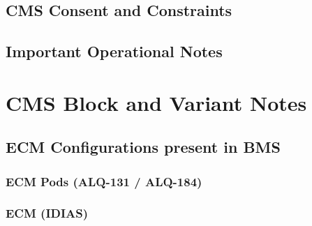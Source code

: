 \documentclass[11pt, a4paper, twoside]{report}
\begin{document}
\subsection{CMS Consent and Constraints}
\label{sec:C5-S2-S3}

\subsection{Important Operational Notes}
\label{sec:C5-S2-S4}

\section{CMS Block and Variant Notes}
\label{sec:C5-S3}

\subsection{ECM Configurations present in BMS}
\label{sec:C5-S3-S1}

\subsubsection{ECM Pods (ALQ-131 / ALQ-184)}
\label{sec:C5-S3-S1-S1}

\subsubsection{ECM (IDIAS)}
\label{sec:C5-S3-S1-S2}
\end{document}
